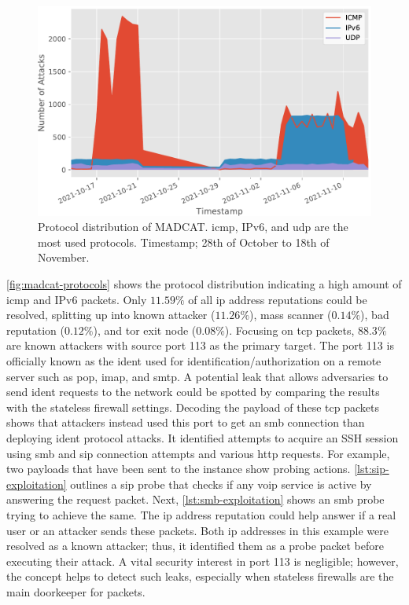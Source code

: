 \begin{figure}
    \centering
    \includegraphics[width=\textwidth]{figures/madcat-protocol-usage.pdf}
    \caption[Protocol distribution of MADCAT]{
        Protocol distribution of MADCAT. \ac{icmp}, IPv6, and \ac{udp} are the most used protocols.
        Timestamp; 28th of October to 18th of November.
    }
    \label{fig:madcat-protocols}
\end{figure}

\autoref{fig:madcat-protocols} shows the protocol distribution indicating a high amount of \ac{icmp} and IPv6 packets.
Only $11.59\%$ of all \ac{ip} address reputations could be resolved, splitting up into known attacker ($11.26\%$), mass scanner ($0.14\%$), bad reputation ($0.12\%$), and tor exit node ($0.08\%$).
Focusing on \ac{tcp} packets, $88.3\%$ are known attackers with source port 113 as the primary target.
The port 113 is officially known as the \ac{ident}\cite{rfc1413} used for identification/authorization on a remote server such as \ac{pop}, \ac{imap}, and \ac{smtp}.
A potential leak that allows adversaries to send \ac{ident} requests to the network could be spotted by comparing the results with the stateless firewall settings.
Decoding the payload of these \ac{tcp} packets shows that attackers instead used this port to get an \ac{smb} connection than deploying \ac{ident} protocol attacks.
It identified attempts to acquire an SSH session using \ac{smb} and \ac{sip} connection attempts and various \ac{http} requests.
For example, two payloads that have been sent to the instance show probing actions.
\autoref{lst:sip-exploitation} outlines a \ac{sip} probe that checks if any \ac{voip} service is active by answering the request packet.
Next, \autoref{lst:smb-exploitation} shows an \ac{smb} probe trying to achieve the same.
The \ac{ip} address reputation could help answer if a real user or an attacker sends these packets.
Both \ac{ip} addresses in this example were resolved as a known attacker; thus, it identified them as a probe packet before executing their attack.
A vital security interest in port 113 is negligible; however, the concept helps to detect such leaks, especially when stateless firewalls are the main doorkeeper for packets.

